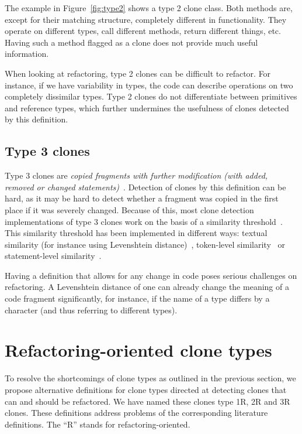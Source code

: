 The example in Figure~\ref{fig:type2} shows a type 2 clone class. Both methods are, except for their matching structure, completely different in functionality. They operate on different types, call different methods, return different things, etc. Having such a method flagged as a clone does not provide much useful information.

When looking at refactoring, type 2 clones can be difficult to refactor. For instance, if we have variability in types, the code can describe operations on two completely dissimilar types. Type 2 clones do not differentiate between primitives and reference types, which further undermines the usefulness of clones detected by this definition.

\subsection{Type 3 clones}\label{sec:type3}
Type 3 clones are \textit{copied fragments with further modification (with added, removed or changed statements)}~\cite{roy2007survey}. Detection of clones by this definition can be hard, as it may be hard to detect whether a fragment was copied in the first place if it was severely changed. Because of this, most clone detection implementations of type 3 clones work on the basis of a similarity threshold~\cite{roy2008nicad,ragkhitwetsagul2019siamese,jiang2007deckard,semura2017ccfindersw}. This similarity threshold has been implemented in different ways: textual similarity (for instance using Levenshtein distance)~\cite{lavoie2011automated}, token-level similarity~\cite{sajnani2016sourcerercc} or statement-level similarity~\cite{kamalpriya2017enhancing}.

Having a definition that allows for any change in code poses serious challenges on refactoring. A Levenshtein distance of one can already change the meaning of a code fragment significantly, for instance, if the name of a type differs by a character (and thus referring to different types).

\section{Refactoring-oriented clone types}\label{sec:rtypes}
To resolve the shortcomings of clone types as outlined in the previous section, we propose alternative definitions for clone types directed at detecting clones that can and should be refactored. We have named these clones type 1R, 2R and 3R clones. These definitions address problems of the corresponding literature definitions. The ``R'' stands for refactoring-oriented.

